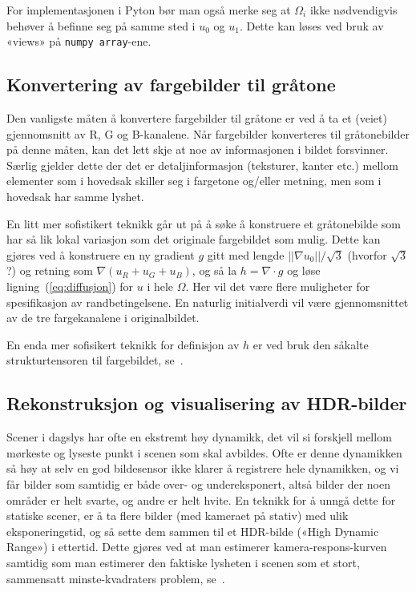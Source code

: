 \documentclass[11pt,a4paper]{article}
\begin{document}
For implementasjonen i Pyton bør man også merke seg at $\Omega_i$ ikke
nødvendigvis behøver å befinne seg på samme sted i $u_0$ og $u_1$.
Dette kan løses ved bruk av «views» på \texttt{numpy array}-ene.

\subsection{Konvertering av fargebilder til gråtone}

Den vanligste måten å konvertere fargebilder til gråtone er ved å ta
et (veiet) gjennomsnitt av R, G og B-kanalene. Når fargebilder
konverteres til gråtonebilder på denne måten, kan det lett skje at noe
av informasjonen i bildet forsvinner. Særlig gjelder dette der det er
detaljinformasjon (teksturer, kanter etc.) mellom elementer som i
hovedsak skiller seg i fargetone og/eller metning, men som i hovedsak
har samme lyshet.

En litt mer sofistikert teknikk går ut på å søke å konstruere et
gråtonebilde som har så lik lokal variasjon som det originale
fargebildet som mulig. Dette kan gjøres ved å konstruere en ny
gradient $g$ gitt med lengde $||\nabla u_0||/\sqrt{3}$ (hvorfor
$\sqrt{3}$?) og retning som $\nabla(u_R + u_G + u_B)$, og så la
$h = \nabla\cdot g$ og løse ligning~(\ref{eq:diffusjon}) for $u$ i
hele $\Omega$. Her vil det være flere muligheter for spesifikasjon av
randbetingelsene. En naturlig initialverdi vil være gjennomsnittet av
de tre fargekanalene i originalbildet.

En enda mer sofisikert teknikk for definisjon av $h$ er ved bruk den
såkalte strukturtensoren til fargebildet, se~\cite{Alsam:08}.

\subsection{Rekonstruksjon og visualisering av HDR-bilder}

Scener i dagslys har ofte en ekstremt høy dynamikk, det vil si
forskjell mellom mørkeste og lyseste punkt i scenen som skal avbildes.
Ofte er denne dynamikken så høy at selv en god bildesensor ikke klarer
å registrere hele dynamikken, og vi får bilder som samtidig er både
over- og undereksponert, altså bilder der noen områder er helt svarte,
og andre er helt hvite. En teknikk for å unngå dette for statiske
scener, er å ta flere bilder (med kameraet på stativ) med ulik
eksponeringstid, og så sette dem sammen til et HDR-bilde («High
Dynamic Range») i ettertid. Dette gjøres ved at man estimerer
kamera-respons-kurven samtidig som man estimerer den faktiske lysheten
i scenen som et stort, sammensatt minste-kvadraters problem,
se~\cite{Debevec:97}.
\end{document}
